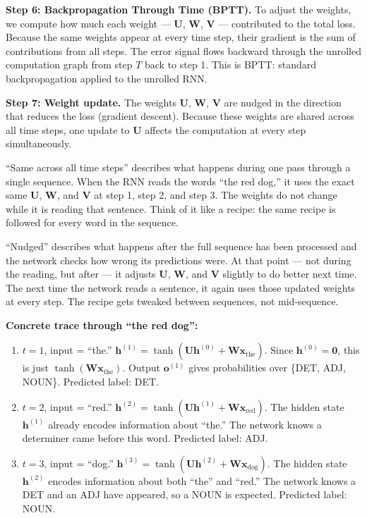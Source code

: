 \medskip
\noindent\textbf{Step 6: Backpropagation Through Time (BPTT).}
To adjust the weights, we compute how much each weight --- $\mathbf{U}$, $\mathbf{W}$,
$\mathbf{V}$ --- contributed to the total loss. Because the same weights appear at every
time step, their gradient is the sum of contributions from all steps. The error signal
flows backward through the unrolled computation graph from step $T$ back to step 1.
This is BPTT: standard backpropagation applied to the unrolled RNN.

\medskip
\noindent\textbf{Step 7: Weight update.}
The weights $\mathbf{U}$, $\mathbf{W}$, $\mathbf{V}$ are nudged in the direction that
reduces the loss (gradient descent). Because these weights are shared across all time
steps, one update to $\mathbf{U}$ affects the computation at every step simultaneously.

``Same across all time steps'' describes what happens during one pass through a single
sequence. When the RNN reads the words ``the red dog,'' it uses the exact same
$\mathbf{U}$, $\mathbf{W}$, and $\mathbf{V}$ at step 1, step 2, and step 3. The weights
do not change while it is reading that sentence. Think of it like a recipe: the same
recipe is followed for every word in the sequence.

``Nudged'' describes what happens after the full sequence has been processed and the
network checks how wrong its predictions were. At that point --- not during the reading,
but after --- it adjusts $\mathbf{U}$, $\mathbf{W}$, and $\mathbf{V}$ slightly to do
better next time. The next time the network reads a sentence, it again uses those updated
weights at every step. The recipe gets tweaked between sequences, not mid-sequence.

\medskip
\noindent\textbf{Concrete trace through ``the red dog'':}

\begin{enumerate}
  \item $t = 1$, input = ``the.''
        $\mathbf{h}^{(1)} = \tanh(\mathbf{U}\mathbf{h}^{(0)} + \mathbf{W}\mathbf{x}_{\text{the}})$.
        Since $\mathbf{h}^{(0)} = \mathbf{0}$, this is just
        $\tanh(\mathbf{W}\mathbf{x}_{\text{the}})$.
        Output $\mathbf{o}^{(1)}$ gives probabilities over \{DET, ADJ, NOUN\}.
        Predicted label: DET.

  \item $t = 2$, input = ``red.''
        $\mathbf{h}^{(2)} = \tanh(\mathbf{U}\mathbf{h}^{(1)} + \mathbf{W}\mathbf{x}_{\text{red}})$.
        The hidden state $\mathbf{h}^{(1)}$ already encodes information about ``the.''
        The network knows a determiner came before this word.
        Predicted label: ADJ.

  \item $t = 3$, input = ``dog.''
        $\mathbf{h}^{(3)} = \tanh(\mathbf{U}\mathbf{h}^{(2)} + \mathbf{W}\mathbf{x}_{\text{dog}})$.
        The hidden state $\mathbf{h}^{(2)}$ encodes information about both ``the'' and
        ``red.'' The network knows a DET and an ADJ have appeared, so a NOUN is expected.
        Predicted label: NOUN.
\end{enumerate}

